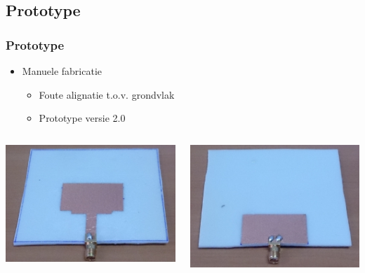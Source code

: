 \documentclass{beamer}
\begin{document}
\subsection{Prototype}
  \begin{frame}
  \frametitle{Prototype}
    \begin{itemize}
      \item Manuele fabricatie 
      \begin{itemize}
      	\item Foute alignatie t.o.v. grondvlak
      	\item Prototype versie 2.0
      \end{itemize} 
    \end{itemize}
    \begin{columns}[c]
    \begin{column}{0.5\textwidth}
      \includegraphics[width=\textwidth, height=0.75\textwidth]{images/patch_proto_front.jpg}
    \end{column}%
    \begin{column}{0.5\textwidth}
      \includegraphics[width=\textwidth, height=0.75\textwidth]{images/patch_proto_back.jpg}
    \end{column}
    \end{columns}
  \end{frame}
\end{document}
